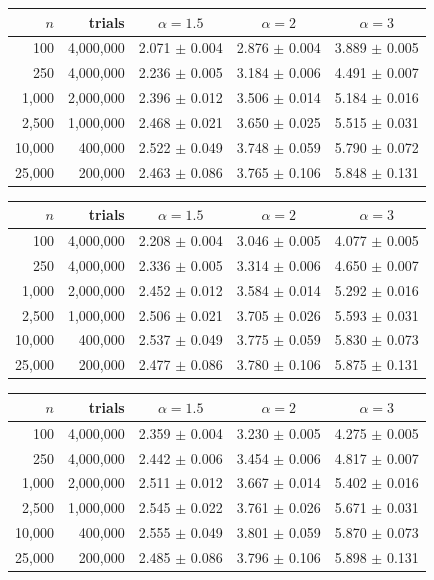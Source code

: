 \begin{tabular}{rrccc}
\hline
$n$ & trials & $\alpha = 1.5$ & $\alpha = 2$ & $\alpha = 3$ \\ \hline
100 & 4{,}000{,}000 & 2.071 $\pm$ 0.004 & 2.876 $\pm$ 0.004 & 3.889 $\pm$ 0.005 \\
250 & 4{,}000{,}000 & 2.236 $\pm$ 0.005 & 3.184 $\pm$ 0.006 & 4.491 $\pm$ 0.007 \\
1{,}000 & 2{,}000{,}000 & 2.396 $\pm$ 0.012 & 3.506 $\pm$ 0.014 & 5.184 $\pm$ 0.016 \\
2{,}500 & 1{,}000{,}000 & 2.468 $\pm$ 0.021 & 3.650 $\pm$ 0.025 & 5.515 $\pm$ 0.031 \\
10{,}000 & 400{,}000 & 2.522 $\pm$ 0.049 & 3.748 $\pm$ 0.059 & 5.790 $\pm$ 0.072 \\
25{,}000 & 200{,}000 & 2.463 $\pm$ 0.086 & 3.765 $\pm$ 0.106 & 5.848 $\pm$ 0.131 \\
\hline
\end{tabular}

\begin{tabular}{rrccc}
\hline
$n$ & trials & $\alpha = 1.5$ & $\alpha = 2$ & $\alpha = 3$ \\ \hline
100 & 4{,}000{,}000 & 2.208 $\pm$ 0.004 & 3.046 $\pm$ 0.005 & 4.077 $\pm$ 0.005 \\
250 & 4{,}000{,}000 & 2.336 $\pm$ 0.005 & 3.314 $\pm$ 0.006 & 4.650 $\pm$ 0.007 \\
1{,}000 & 2{,}000{,}000 & 2.452 $\pm$ 0.012 & 3.584 $\pm$ 0.014 & 5.292 $\pm$ 0.016 \\
2{,}500 & 1{,}000{,}000 & 2.506 $\pm$ 0.021 & 3.705 $\pm$ 0.026 & 5.593 $\pm$ 0.031 \\
10{,}000 & 400{,}000 & 2.537 $\pm$ 0.049 & 3.775 $\pm$ 0.059 & 5.830 $\pm$ 0.073 \\
25{,}000 & 200{,}000 & 2.477 $\pm$ 0.086 & 3.780 $\pm$ 0.106 & 5.875 $\pm$ 0.131 \\
\hline
\end{tabular}

\begin{tabular}{rrccc}
\hline
$n$ & trials & $\alpha = 1.5$ & $\alpha = 2$ & $\alpha = 3$ \\ \hline
100 & 4{,}000{,}000 & 2.359 $\pm$ 0.004 & 3.230 $\pm$ 0.005 & 4.275 $\pm$ 0.005 \\
250 & 4{,}000{,}000 & 2.442 $\pm$ 0.006 & 3.454 $\pm$ 0.006 & 4.817 $\pm$ 0.007 \\
1{,}000 & 2{,}000{,}000 & 2.511 $\pm$ 0.012 & 3.667 $\pm$ 0.014 & 5.402 $\pm$ 0.016 \\
2{,}500 & 1{,}000{,}000 & 2.545 $\pm$ 0.022 & 3.761 $\pm$ 0.026 & 5.671 $\pm$ 0.031 \\
10{,}000 & 400{,}000 & 2.555 $\pm$ 0.049 & 3.801 $\pm$ 0.059 & 5.870 $\pm$ 0.073 \\
25{,}000 & 200{,}000 & 2.485 $\pm$ 0.086 & 3.796 $\pm$ 0.106 & 5.898 $\pm$ 0.131 \\
\hline
\end{tabular}
